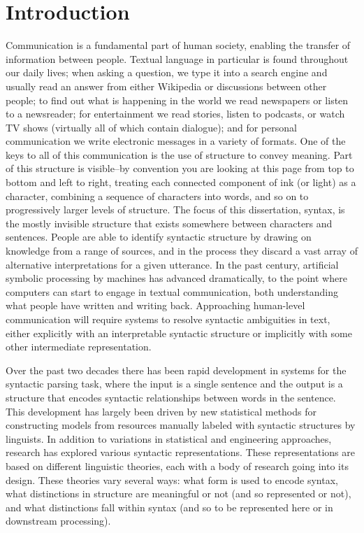 \chapter{Introduction}

Communication is a fundamental part of human society, enabling the transfer of information between people.
Textual language in particular is found throughout our daily lives;
when asking a question, we type it into a search engine and usually read an answer from either Wikipedia or discussions between other people;
to find out what is happening in the world we read newspapers or listen to a newsreader;
for entertainment we read stories, listen to podcasts, or watch TV shows (virtually all of which contain dialogue);
and for personal communication we write electronic messages in a variety of formats.
One of the keys to all of this communication is the use of structure to convey meaning.
Part of this structure is visible--by convention you are looking at this page from top to bottom and left to right, treating each connected component of ink (or light) as a character, combining a sequence of characters into words, and so on to progressively larger levels of structure.
The focus of this dissertation, syntax, is the mostly invisible structure that exists somewhere between characters and sentences.
People are able to identify syntactic structure by drawing on knowledge from a range of sources, and in the process they discard a vast array of alternative interpretations for a given utterance.
In the past century, artificial symbolic processing by machines has advanced dramatically, to the point where computers can start to engage in textual communication, both understanding what people have written and writing back.
Approaching human-level communication will require systems to resolve syntactic ambiguities in text, either explicitly with an interpretable syntactic structure or implicitly with some other intermediate representation.

Over the past two decades there has been rapid development in systems for the syntactic parsing task, where the input is a single sentence and the output is a structure that encodes syntactic relationships between words in the sentence.
This development has largely been driven by new statistical methods for constructing models from resources manually labeled with syntactic structures by linguists.
In addition to variations in statistical and engineering approaches, research has explored various syntactic representations.
These representations are based on different linguistic theories, each with a body of research going into its design.
These theories vary several ways: what form is used to encode syntax, what distinctions in structure are meaningful or not (and so represented or not), and what distinctions fall within syntax (and so to be represented here or in downstream processing).

